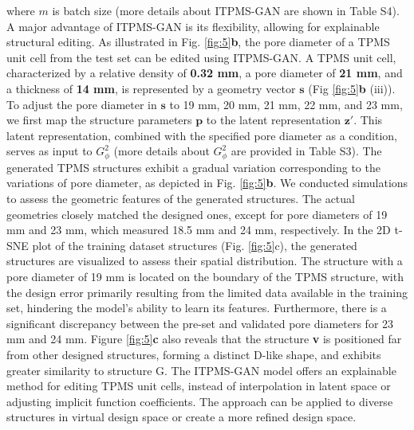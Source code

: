 \documentclass[preprint,review,12pt,authoryear]{elsarticle}
\begin{document}
where $m$ is batch size (more details about ITPMS-GAN are shown in Table S4). A major advantage of ITPMS-GAN is its flexibility, allowing for explainable structural editing. As illustrated in Fig. \ref{fig:5}\textbf{b}, the pore diameter of a TPMS unit cell from the test set can be edited using ITPMS-GAN. A TPMS unit cell, characterized by a relative density of\textbf{ 0.32 mm}, a pore diameter of \textbf{21 mm}, and a thickness of \textbf{14 mm}, is represented by a geometry vector $\boldsymbol{s}$ (Fig \ref{fig:5}\textbf{b} (iii)). To adjust the pore diameter in $\boldsymbol{s}$ to 19 mm, 20 mm, 21 mm, 22 mm, and 23 mm, we first map the structure parameters $\boldsymbol{p}$ to the latent representation $\boldsymbol{z}'$. This latent representation, combined with the specified pore diameter as a condition, serves as input to $G_\phi^2$ (more details about $G^2_\phi$ are provided in Table S3). The generated TPMS structures exhibit a gradual variation corresponding to the variations of pore diameter, as depicted in Fig. \ref{fig:5}\textbf{b}. We conducted simulations to assess the geometric features of the generated structures. The actual geometries closely matched the designed ones, except for pore diameters of 19 mm and 23 mm, which measured 18.5 mm and 24 mm, respectively. In the 2D t-SNE plot of the training dataset structures (Fig. \ref{fig:5}c), the generated structures are visualized to assess their spatial distribution. The structure with a pore diameter of 19 mm is located on the boundary of the TPMS structure, with the design error primarily resulting from the limited data available in the training set, hindering the model's ability to learn its features. Furthermore, there is a significant discrepancy between the pre-set and validated pore diameters for 23 mm and 24 mm. Figure \ref{fig:5}\textbf{c} also reveals that the structure \textbf{v} is positioned far from other designed structures, forming a distinct D-like shape, and exhibits greater similarity to structure G. The ITPMS-GAN model offers an explainable method for editing TPMS unit cells, instead of interpolation in latent space or adjusting implicit function coefficients. The approach can be applied to diverse structures in virtual design space or create a more refined design space.
\end{document}
